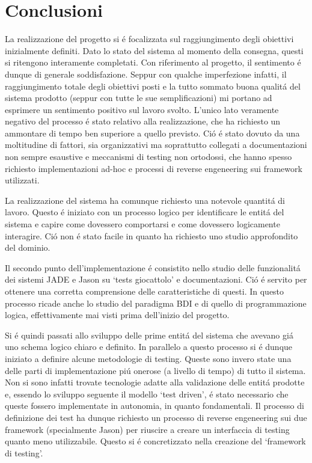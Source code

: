 \section{Conclusioni}

La realizzazione del progetto si \'e focalizzata sul raggiungimento degli obiettivi inizialmente definiti. Dato lo stato del sistema al momento della consegna, questi si ritengono interamente completati. Con riferimento al progetto, il sentimento \'e dunque di generale soddisfazione. Seppur con qualche imperfezione infatti, il raggiungimento totale degli obiettivi posti e la tutto sommato buona qualit\'a del sistema prodotto (seppur con tutte le sue semplificazioni) mi portano ad esprimere un sentimento positivo sul lavoro svolto. L'unico lato veramente negativo del processo \'e stato relativo alla realizzazione, che ha richiesto un ammontare di tempo ben superiore a quello previsto. Ci\'o \'e stato dovuto da una moltitudine di fattori, sia organizzativi ma soprattutto collegati a documentazioni non sempre esaustive e meccanismi di testing non ortodossi, che hanno spesso richiesto implementazioni ad-hoc e processi di reverse engeneering sui framework utilizzati.

\parag
La realizzazione del sistema ha comunque richiesto una notevole quantit\'a di lavoro. Questo \'e iniziato con un processo logico per identificare le entit\'a del sistema e capire come dovessero comportarsi e come dovessero logicamente interagire. Ci\'o non \'e stato facile in quanto ha richiesto uno studio approfondito del dominio.

Il secondo punto dell'implementazione \'e consistito nello studio delle funzionalit\'a dei sistemi JADE e Jason su `tests giocattolo' e documentazioni. Ci\'o \'e servito per ottenere una corretta comprensione delle caratteristiche di questi. In questo processo ricade anche lo studio del paradigma BDI e di quello di programmazione logica, effettivamente mai visti prima dell'inizio del progetto.

Si \'e quindi passati allo sviluppo delle prime entit\'a del sistema che avevano gi\'a uno schema logico chiaro e definito. In parallelo a questo processo si \'e dunque iniziato a definire alcune metodologie di testing. Queste sono invero state una delle parti di implementazione pi\'u onerose (a livello di tempo) di tutto il sistema. Non si sono infatti trovate tecnologie adatte alla validazione delle entit\'a prodotte e, essendo lo sviluppo seguente il modello `test driven', \'e stato necessario che queste fossero implementate in autonomia, in quanto fondamentali. Il processo di definizione dei test ha dunque richiesto un processo di reverse engeneering sui due framework (specialmente Jason) per riuscire a creare un interfaccia di testing quanto meno utilizzabile. Questo si \'e concretizzato nella creazione del `framework di testing'.

